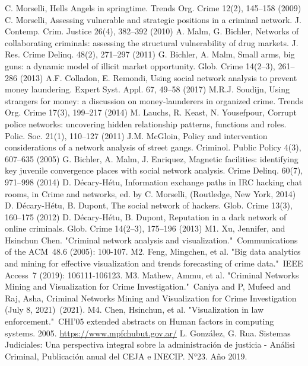 \documentclass[runningheads]{llncs}
\begin{document}
\begin{thebibliography}{8}
C. Morselli, Hells Angels in springtime. Trends Org. Crime 12(2), 145–158 (2009)
C. Morselli, Assessing vulnerable and strategic positions in a criminal network. J. Contemp. Crim. Justice 26(4), 382–392 (2010)
A. Malm, G. Bichler, Networks of collaborating criminals: assessing the structural vulnerability of drug markets. J. Res. Crime Delinq. 48(2), 271–297 (2011)
G. Bichler, A. Malm, Small arms, big guns: a dynamic model of illicit market opportunity. Glob. Crime 14(2–3), 261–286 (2013)
A.F. Colladon, E. Remondi, Using social network analysis to prevent money laundering. Expert Syst. Appl. 67, 49–58 (2017)
M.R.J. Soudijn, Using strangers for money: a discussion on money-launderers in organized crime. Trends Org. Crime 17(3), 199–217 (2014)
M. Lauchs, R. Keast, N. Yousefpour, Corrupt police networks: uncovering hidden relationship patterns, functions and roles. Polic. Soc. 21(1), 110–127 (2011)
J.M. McGloin, Policy and intervention considerations of a network analysis of street gangs. Criminol. Public Policy 4(3), 607–635 (2005)
G. Bichler, A. Malm, J. Enriquez, Magnetic facilities: identifying key juvenile convergence places with social network analysis. Crime Delinq. 60(7), 971–998 (2014)
D. Décary-Hétu, Information exchange paths in IRC hacking chat rooms, in Crime and networks, ed. by C. Morselli, (Routledge, New York, 2014)
D. Décary-Hétu, B. Dupont, The social network of hackers. Glob. Crime 13(3), 160–175 (2012)
D. Décary-Hétu, B. Dupont, Reputation in a dark network of online criminals. Glob. Crime 14(2–3), 175–196 (2013)
M1. Xu, Jennifer, and Hsinchun Chen. "Criminal network analysis and visualization." Communications of the ACM 48.6 (2005): 100-107.
M2. Feng, Mingchen, et al. "Big data analytics and mining for effective visualization and trends forecasting of crime data." IEEE Access 7 (2019): 106111-106123.
M3. Mathew, Ammu, et al. "Criminal Networks Mining and Visualization for Crime Investigation." Caniya and P, Mufeed and Raj, Asha, Criminal Networks Mining and Visualization for Crime Investigation (July 8, 2021) (2021).
M4. Chen, Hsinchun, et al. "Visualization in law enforcement." CHI'05 extended abstracts on Human factors in computing systems. 2005.
\url{https://www.mpfchubut.gov.ar/}
L. González, G. Rua. Sistemas Judiciales: Una perspectiva integral sobre la administración de justicia - Análisi Criminal, Publicación anual del CEJA e INECIP. N°23. Año 2019.

\end{thebibliography}
\end{document}
